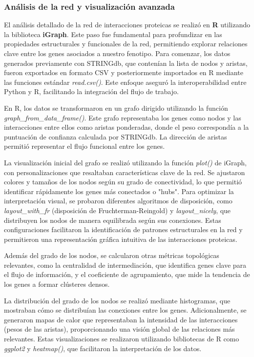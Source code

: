 \subsubsection{\textbf{Análisis de la red y visualización avanzada}}

El análisis detallado de la red de interacciones proteicas se realizó en \textbf{R} utilizando la biblioteca \textbf{iGraph}. Este paso fue fundamental para profundizar en las propiedades estructurales y funcionales de la red, permitiendo explorar relaciones clave entre los genes asociados a nuestro fenotipo. Para comenzar, los datos generados previamente con STRINGdb, que contenían la lista de nodos y aristas, fueron exportados en formato CSV y posteriormente importados en R mediante las funciones estándar \textit{read.csv()}. Este enfoque aseguró la interoperabilidad entre Python y R, facilitando la integración del flujo de trabajo.

En R, los datos se transformaron en un grafo dirigido utilizando la función \textit{graph\_from\_data\_frame()}. Este grafo representaba los genes como nodos y las interacciones entre ellos como aristas ponderadas, donde el peso correspondía a la puntuación de confianza calculada por STRINGdb. La dirección de aristas permitió representar el flujo funcional entre los genes.

La visualización inicial del grafo se realizó utilizando la función \textit{plot()} de iGraph, con personalizaciones que resaltaban características clave de la red. Se ajustaron colores y tamaños de los nodos según su grado de conectividad, lo que permitió identificar rápidamente los genes más conectados o "hubs". Para optimizar la interpretación visual, se probaron diferentes algoritmos de disposición, como \textit{layout\_with\_fr} (disposición de Fruchterman-Reingold) y \textit{layout\_nicely}, que distribuyen los nodos de manera equilibrada según sus conexiones. Estas configuraciones facilitaron la identificación de patrones estructurales en la red y permitieron una representación gráfica intuitiva de las interacciones proteicas.

Además del grado de los nodos, se calcularon otras métricas topológicas relevantes, como la centralidad de intermediación, que identifica genes clave para el flujo de información, y el coeficiente de agrupamiento, que mide la tendencia de los genes a formar clústeres densos.

La distribución del grado de los nodos se realizó mediante histogramas, que mostraban cómo se distribuían las conexiones entre los genes. Adicionalmente, se generaron mapas de calor que representaban la intensidad de las interacciones (pesos de las aristas), proporcionando una visión global de las relaciones más relevantes. Estas visualizaciones se realizaron utilizando bibliotecas de R como \textit{ggplot2} y \textit{heatmap()}, que facilitaron la interpretación de los datos.

